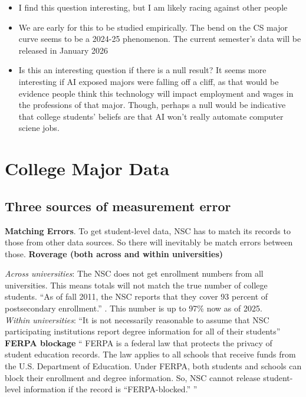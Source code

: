 \documentclass[12pt]{article}
\begin{document}
\begin{itemize}
\item   I find this question interesting, but I am likely racing against other people\\ 
\item We are early for this to be studied empirically. The bend on the CS major curve seems to be a 2024-25 phenomenon. The current semester's data will be released in January 2026
\item Is this an interesting question if there is a null result? It seems more interesting if AI exposed majors were falling off a cliff, as that would be evidence people think this technology will impact employment and wages in the professions of that major. Though, perhaps a null would be indicative that college students' beliefs are that AI won't really automate computer sciene jobs. 

 
   
\end{itemize}





\appendix
\section{College Major Data}
\subsection{Three sources of measurement error \citep{dynarski2013missing}}
\textbf{Matching Errors}. To get student-level data, NSC has to match its records to those from other data sources. So there will inevitably be match errors between those. 
\textbf{Roverage (both across and within universities)}


\textit{Across universities}: The NSC does not get enrollment numbers from all universities. This means totals will not match the true number of college students.  ``As of fall 2011, the NSC reports that they cover 93 percent of postsecondary enrollment.'' \citep{dynarski2013missing}. This number is up to 97\% now as of 2025.\\
\textit{Within universities}: ``It is not necessarily reasonable to assume that NSC participating institutions report degree information for all of their students''
\textbf{FERPA blockage} `` FERPA is a federal law that protects the privacy of student education 
records. The law applies to all schools that receive funds from the U.S. Department of Education.
Under FERPA, both students and schools can block their enrollment and degree information.
So, NSC cannot release student-level information if the record is “FERPA-blocked.” ''
\end{document}
